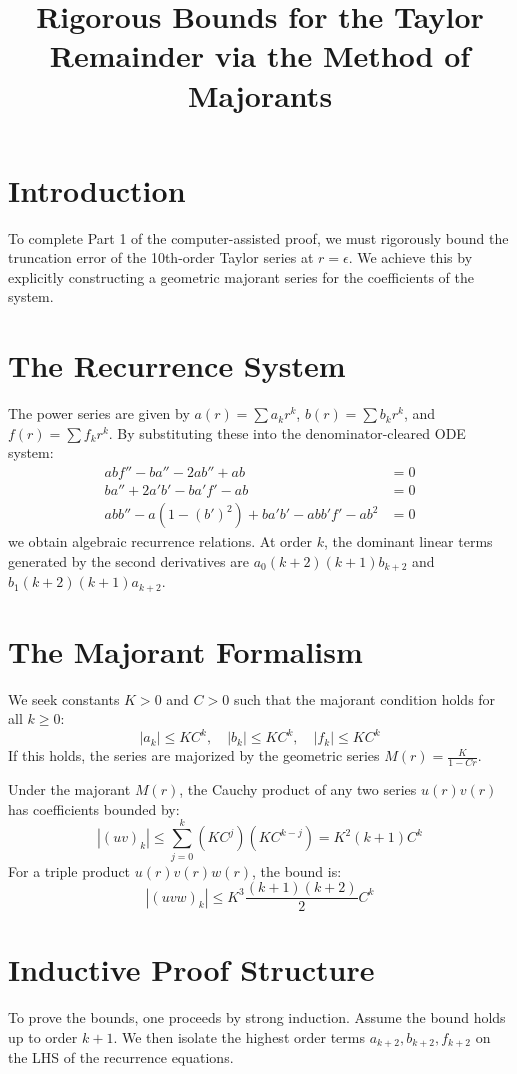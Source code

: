 \documentclass[12pt]{article}
\title{\textbf{Rigorous Bounds for the Taylor Remainder via the Method of Majorants}}
\date{}
\begin{document}
\maketitle

\section{Introduction}
To complete Part 1 of the computer-assisted proof, we must rigorously bound the truncation error of the 10th-order Taylor series at $r = \epsilon$. We achieve this by explicitly constructing a geometric majorant series for the coefficients of the system.

\section{The Recurrence System}
The power series are given by $a(r) = \sum a_k r^k$, $b(r) = \sum b_k r^k$, and $f(r) = \sum f_k r^k$. 
By substituting these into the denominator-cleared ODE system:
\begin{align*}
abf'' - ba'' - 2ab'' + ab &= 0 \\
ba'' + 2a'b' - ba'f' - ab &= 0 \\
abb'' - a(1 - (b')^2) + ba'b' - abb'f' - ab^2 &= 0
\end{align*}
we obtain algebraic recurrence relations. At order $k$, the dominant linear terms generated by the second derivatives are $a_0 (k+2)(k+1) b_{k+2}$ and $b_1 (k+2)(k+1) a_{k+2}$. 

\section{The Majorant Formalism}
We seek constants $K > 0$ and $C > 0$ such that the majorant condition holds for all $k \ge 0$:
\[ |a_k| \le K C^k, \quad |b_k| \le K C^k, \quad |f_k| \le K C^k \]
If this holds, the series are majorized by the geometric series $M(r) = \frac{K}{1 - Cr}$.

Under the majorant $M(r)$, the Cauchy product of any two series $u(r)v(r)$ has coefficients bounded by:
\[ |(uv)_k| \le \sum_{j=0}^k (K C^j)(K C^{k-j}) = K^2 (k+1) C^k \]
For a triple product $u(r)v(r)w(r)$, the bound is:
\[ |(uvw)_k| \le K^3 \frac{(k+1)(k+2)}{2} C^k \]

\section{Inductive Proof Structure}
To prove the bounds, one proceeds by strong induction. Assume the bound holds up to order $k+1$. We then isolate the highest order terms $a_{k+2}, b_{k+2}, f_{k+2}$ on the LHS of the recurrence equations.
\end{document}
